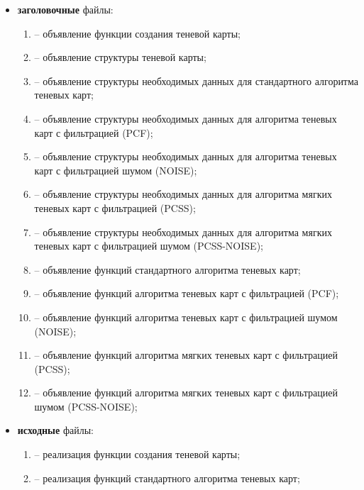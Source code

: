 \begin{itemize}[label=---]
    \item \textbf{заголовочные} файлы:
    \begin{enumerate}[label=\arabic*), labelsep=0.5em]
        \item {} -- объявление функции создания теневой карты;
        \item {} -- объявление структуры теневой карты;
        \item {} -- объявление структуры необходимых данных для
        стандартного алгоритма теневых карт;
        \item {} -- объявление структуры необходимых данных для
        алгоритма теневых карт с фильтрацией (PCF);
        \item {} -- объявление структуры необходимых данных для
        алгоритма теневых карт с фильтрацией шумом (NOISE);
        \item {} -- объявление структуры необходимых данных для
        алгоритма мягких теневых карт с фильтрацией (PCSS);
        \item {} -- объявление структуры необходимых данных для
        алгоритма мягких теневых карт с фильтрацией шумом (PCSS-NOISE);
        \item {} -- объявление функций стандартного алгоритма теневых карт;
        \item {} -- объявление функций алгоритма теневых карт с фильтрацией (PCF);
        \item {} -- объявление функций алгоритма теневых карт с фильтрацией шумом (NOISE);
        \item {} -- объявление функций алгоритма мягких теневых карт с фильтрацией (PCSS);
        \item {} -- объявление функций алгоритма мягких теневых карт с фильтрацией шумом (PCSS-NOISE);
    \end{enumerate}
    \item \textbf{исходные} файлы:
    \begin{enumerate}[label=\arabic*), labelsep=0.5em]
        \item {} -- реализация функции создания теневой карты;
        \item {} -- реализация функций стандартного алгоритма теневых карт;

\end{enumerate}
\end{itemize}

